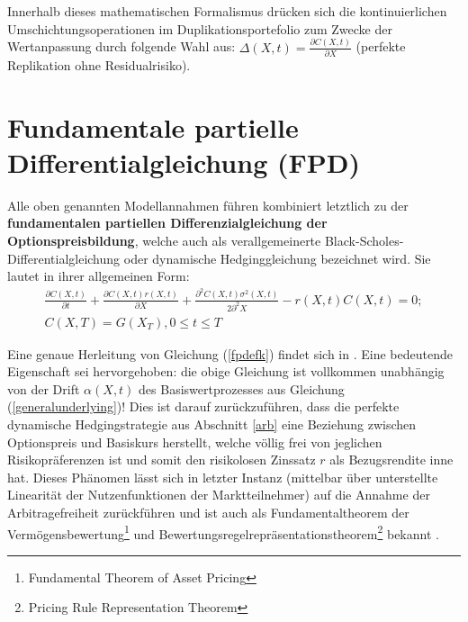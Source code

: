 \documentclass[12pt,a4paper,headsepline,bibliography=totoc,listof=totoc,headinclude=false,footinclude=false,BCOR5mm]{scrreprt} %
\begin{document}
Innerhalb dieses mathematischen Formalismus dr\"ucken sich die kontinuierlichen Umschichtungsoperationen im Duplikationsportefolio zum Zwecke der Wertanpassung durch folgende Wahl  aus: $\Delta(X,t) = \frac{\partial C(X,t)}{  \partial X}$ (perfekte Replikation ohne Residualrisiko).

\section{Fundamentale partielle Differentialgleichung (FPD)}\label{FPD}
Alle oben genannten Modellannahmen f\"uhren kombiniert letztlich zu der {\bf fundamentalen partiellen Differenzialgleichung der Optionspreisbildung}, welche auch als verallgemeinerte Black-Scholes-Differentialgleichung\cite[S. 222 ff]{Singer1999} oder dynamische Hedginggleichung \cite{Zimmermann2000} bezeichnet wird. Sie lautet in ihrer allgemeinen Form:
 \begin{equation} \label{fpdefk}
\begin{split}
\frac{\partial C(X,t)}{\partial t} + \frac{\partial C(X,t)r(X,t)}{\partial X}+
\frac{\partial^{2} C(X,t) \sigma^{2}(X,t)}{2\partial^{2} X}  - r(X,t)C(X,t) = 0;  \\ C(X,T) = G(X_{T}), 0 \leq t \leq T\end {split}\end{equation}

Eine genaue Herleitung von Gleichung (\ref{fpdefk}) findet sich in \cite[S. 222 ff]{Singer1999} \cite{Zimmermann2000} \cite{Franke2004}. Eine bedeutende Eigenschaft sei hervorgehoben: die obige Gleichung ist vollkommen unabh\"angig von der Drift $\alpha (X,t)$ des Basiswertprozesses aus Gleichung (\ref{generalunderlying})! Dies ist darauf zur\"uckzuf\"uhren, dass die perfekte dynamische Hedgingstrategie aus Abschnitt \ref{arb} eine Beziehung zwischen Optionspreis und Basiskurs herstellt, welche v\"ollig frei von jeglichen Risikopr\"aferenzen ist \cite{Cox1975} und somit den risikolosen Zinssatz $r$ als Bezugsrendite inne hat. Dieses Ph\"anomen l\"asst sich in letzter Instanz (mittelbar \"uber unterstellte Linearit\"at der Nutzenfunktionen der Marktteilnehmer) auf die Annahme der Arbitragefreiheit zur\"uckf\"uhren \cite[S. 336]{Merton2003}\cite[S. 153]{Cox1976}\cite{Harrison1981} und ist auch als Fundamentaltheorem der Verm\"ogensbewertung\footnote{Fundamental Theorem of Asset Pricing} und Bewertungsregelrepr\"asentationstheorem\footnote{Pricing Rule Representation Theorem} bekannt \cite[S.9]{Philip2003} \cite{Schachermayer2008}.
\end{document}

